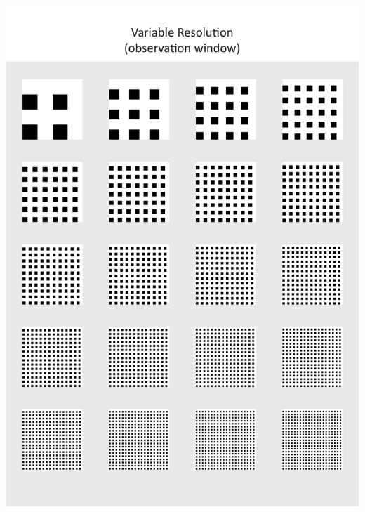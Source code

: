 \documentclass[
  12pt,
  a4paper, twoside]{book}
\begin{document}
\begin{center}\includegraphics[width=1\linewidth]{Appendix/res_obs} \end{center}

\newpage
\end{document}
